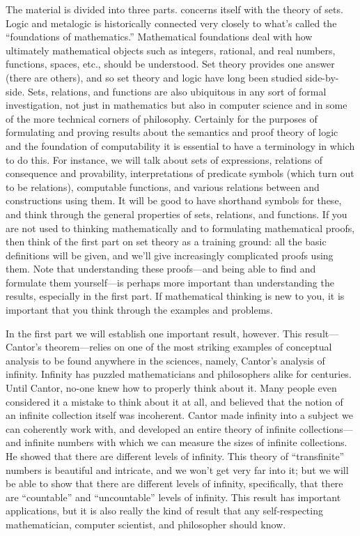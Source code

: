 The material is divided into three parts. 
concerns itself with the theory of sets. Logic and metalogic is
historically connected very closely to what's called the ``foundations
of mathematics.''  Mathematical foundations deal with how ultimately
mathematical objects such as integers, rational, and real numbers,
functions, spaces, etc., should be understood. Set theory provides one
answer (there are others), and so set theory and logic have long been
studied side-by-side. Sets, relations, and functions are also
ubiquitous in any sort of formal investigation, not just in
mathematics but also in computer science and in some of the more
technical corners of philosophy. Certainly for the purposes of
formulating and proving results about the semantics and proof theory
of logic and the foundation of computability it is essential to have a
terminology in which to do this. For instance, we will talk about sets
of expressions, relations of consequence and provability,
interpretations of predicate symbols (which turn out to be relations),
computable functions, and various relations between and constructions
using them. It will be good to have shorthand symbols for these, and
think through the general properties of sets, relations, and
functions. If you are not used to thinking mathematically and to
formulating mathematical proofs, then think of the first part on set
theory as a training ground: all the basic definitions will be given,
and we'll give increasingly complicated proofs using them. Note that
understanding these proofs---and being able to find and formulate them
yourself---is perhaps more important than understanding the results,
especially in the first part. If mathematical thinking is new to you,
it is important that you think through the examples and problems.

In the first part we will establish one important result, however.
This result---Cantor's theorem---relies on one of the most striking
examples of conceptual analysis to be found anywhere in the sciences,
namely, Cantor's analysis of infinity. Infinity has puzzled
mathematicians and philosophers alike for centuries. Until Cantor,
no-one knew how to properly think about it. Many people even
considered it a mistake to think about it at all, and believed that
the notion of an infinite collection itself was incoherent. Cantor
made infinity into a subject we can coherently work with, and
developed an entire theory of infinite collections---and infinite
numbers with which we can measure the sizes of infinite collections.
He showed that there are different levels of infinity. This theory of
``transfinite'' numbers is beautiful and intricate, and we won't get
very far into it; but we will be able to show that there are different
levels of infinity, specifically, that there are ``countable'' and
``uncountable'' levels of infinity. This result has important
applications, but it is also really the kind of result that any
self-respecting mathematician, computer scientist, and philosopher
should know.

